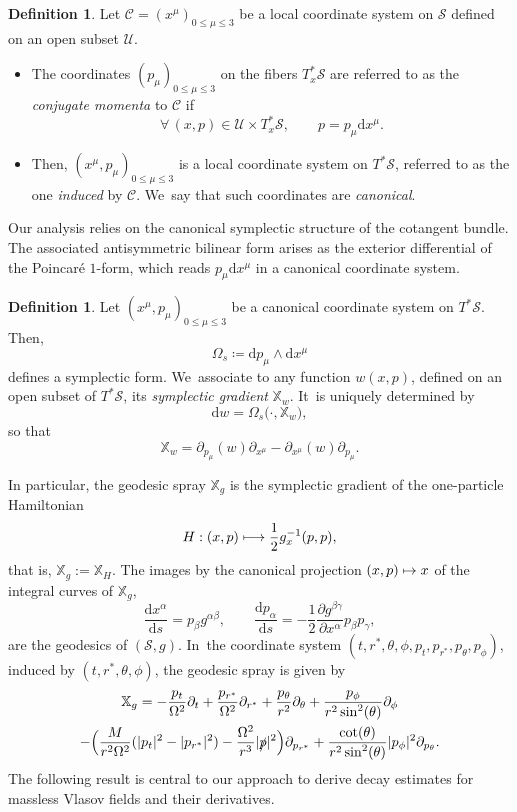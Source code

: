 \documentclass[10pt]{amsart}
\newcommand\mto{\mathchoice{\longmapsto}{\mapsto}{\mapsto}{\mapsto}}
\theoremstyle{plain}
\theoremstyle{definition}
\newtheorem{definition}[proposition]{Definition}
\newcommand\T{{\mathbb{X}}}
\newcommand\dr{{\mathrm{d}}}
\begin{document}
\begin{definition}\label{Defcoord}
Let $\mathscr{C}=(x^{\mu})_{0 \leq \mu \leq 3}$ be a local coordinate system on $\mathcal{S}$ defined on an open subset $\mathcal{U}$.
\begin{itemize}
\item The coordinates $(p_\mu)_{0 \leq \mu \leq 3}$ on the fibers $T_x^* \mathcal{S}$ are referred to as the \emph{conjugate momenta} to $\mathscr{C}$ if
\[
\forall \, (x,p) \in \mathcal{U} \times T_x^* \mathcal{S},\qquad p=p_\mu \dr x^\mu.
\]
\item Then, $(x^\mu,p_\mu)_{0 \leq \mu \leq 3}$ is a local coordinate system on $T^* \mathcal{S}$, referred to as the one \emph{induced} by $\mathscr{C}$. We~say that such coordinates are \emph{canonical}.
\end{itemize}
\end{definition}

Our analysis relies on the canonical symplectic structure of the cotangent bundle. The associated antisymmetric bilinear form arises as the exterior differential of the Poincaré $1$-form, which reads $p_\mu \dr x^\mu$ in a canonical coordinate system.

\begin{definition}
Let $(x^\mu,p_\mu)_{0 \leq \mu \leq 3}$ be a canonical coordinate system on $T^* \mathcal{S}$. Then,
\[
\Omega_s \coloneqq \dr p_\mu \wedge \dr x^\mu
\]
defines a symplectic form. We~associate to any function $w (x,p)$, defined on an open subset of $T^* \mathcal{S}$, its \emph{symplectic gradient} $\T_w$. It~is uniquely determined by
\[
\dr w = \Omega_s \bigl(\cdot, \T_w \bigr),
\]
so that
\[
\T_w = \partial_{p_\mu}(w) \partial_{x^\mu}-\partial_{x^\mu}(w) \partial_{p_\mu}.
\]
\end{definition}

In particular, the geodesic spray $\T_g$ is the symplectic gradient of the one-particle Hamiltonian
\[
H:(x,p) \mto \frac{1}{2}g^{-1}_x(p,p),
\]
that is, $\T_g := \T_H$. The images by the canonical projection $(x,p) \mto x$ of the integral curves of $\T_g$,
\[
\frac{\dr x^{\alpha}}{\dr s}=p_{\beta}g^{\alpha\beta}, \qquad \frac{\dr p_{\alpha}}{\dr s}=-\frac{1}{2}\frac{\partial g^{\beta\gamma}}{\partial x^{\alpha}}p_{\beta}p_{ \gamma},
\]
are the geodesics of $(\mathcal{S},g)$. In~the coordinate system $(t,r^*,\theta,\phi,p_t,p_{r^*},p_\theta,p_\phi)$, induced by $(t,r^*,\theta,\phi)$, the geodesic spray is given by
\begin{multline*}
\mathbb{X}_{g}=-\frac{p_t}{\Omega^2} \partial_t + \frac{p_{r^*}}{\Omega^2} \partial_{r^*}+\frac{p_{\theta}}{r^2} \partial_{\theta} + \frac{p_{\phi}}{r^2 \sin^2 (\theta)} \partial_{\phi} \\
-\Bigl(\frac{M}{r^2\Omega^2}(|p_t|^2-|p_{r^*}|^2)-\frac{\Omega^2}{r^3}|\slashed{p}|^2 \Bigr) \partial_{p_{r^*} }+\frac{\cot (\theta)}{r^2 \sin^2 (\theta)} |p_{\phi}|^2 \partial_{p_{\theta} }.
\end{multline*}
The following result is central to our approach to derive decay estimates for massless Vlasov fields and their derivatives.
\end{document}
